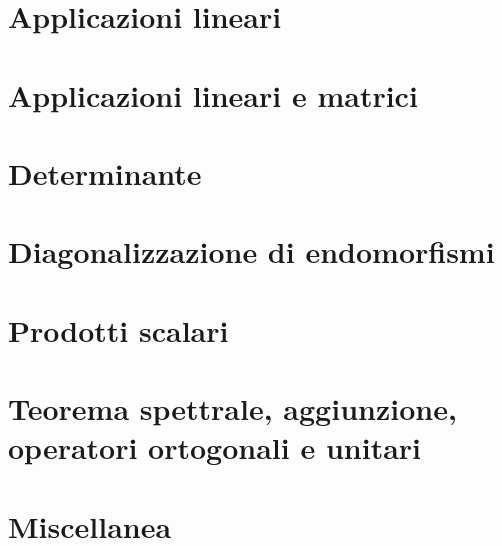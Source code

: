 \documentclass[9pt, a4paper]{article}
\theoremstyle{mythm}
\begin{document}
\clearpage

\section{Applicazioni lineari}


\clearpage

\section{Applicazioni lineari e matrici}




\clearpage

\section{Determinante}


\clearpage

\section{Diagonalizzazione di endomorfismi}



\clearpage

\section{Prodotti scalari}



\clearpage

\section{Teorema spettrale, aggiunzione, operatori ortogonali e unitari}


\clearpage

\section{Miscellanea}

\end{document}
